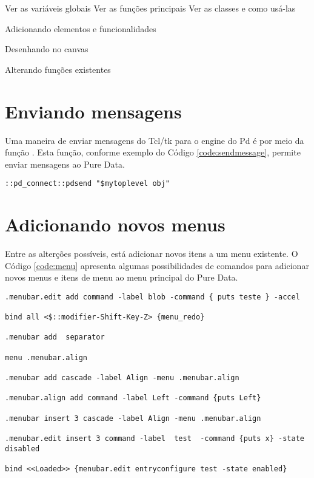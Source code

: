Ver as variáveis globais
Ver as funções principais
Ver as classes e como usá-las

Adicionando elementos e funcionalidades

Desenhando no canvas

Alterando funções existentes


\section{Enviando mensagens}

Uma maneira de enviar mensagens do Tcl/tk para o engine do Pd é por meio da
função .
Esta função, conforme exemplo do Código \ref{code:sendmessage}, permite enviar
mensagens ao Pure Data.

\begin{lstlisting}[caption={Enviando mensagem para o PD (\courier{tripleclick-plugin.tcl})},
label={code:sendmessage}]
::pd_connect::pdsend "$mytoplevel obj"
\end{lstlisting}





\section{Adicionando novos menus}

Entre as alterções possíveis, está adicionar novos itens a um menu existente.
O Código \ref{code:menu} apresenta algumas possibilidades de comandos para 
adicionar novos menus e itens de menu ao menu principal do Pure Data.

\begin{lstlisting}[caption={Alterando o menu.},label={code:menu}]
.menubar.edit add command -label blob -command { puts teste } -accel

bind all <$::modifier-Shift-Key-Z> {menu_redo}

.menubar add  separator

menu .menubar.align

.menubar add cascade -label Align -menu .menubar.align

.menubar.align add command -label Left -command {puts Left}

.menubar insert 3 cascade -label Align -menu .menubar.align

.menubar.edit insert 3 command -label  test  -command {puts x} -state disabled

bind <<Loaded>> {menubar.edit entryconfigure test -state enabled}
\end{lstlisting}

